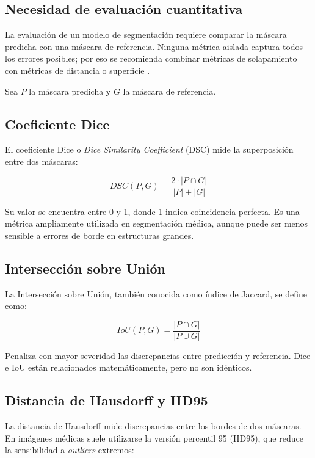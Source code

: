 \subsection{Necesidad de evaluación cuantitativa}

La evaluación de un modelo de segmentación requiere comparar la máscara predicha con una máscara de referencia. Ninguna métrica aislada captura todos los errores posibles; por eso se recomienda combinar métricas de solapamiento con métricas de distancia o superficie \parencite{taha_metrics_2015,maierhein_metrics_reloaded_2024}.

Sea $P$ la máscara predicha y $G$ la máscara de referencia.

\subsection{Coeficiente Dice}

El coeficiente Dice o \textit{Dice Similarity Coefficient} (DSC) mide la superposición entre dos máscaras:

\begin{equation}
DSC(P,G)=\frac{2\cdot |P \cap G|}{|P|+|G|}
\end{equation}

Su valor se encuentra entre 0 y 1, donde 1 indica coincidencia perfecta. Es una métrica ampliamente utilizada en segmentación médica, aunque puede ser menos sensible a errores de borde en estructuras grandes.

\subsection{Intersección sobre Unión}

La Intersección sobre Unión, también conocida como índice de Jaccard, se define como:

\begin{equation}
IoU(P,G)=\frac{|P \cap G|}{|P \cup G|}
\end{equation}

Penaliza con mayor severidad las discrepancias entre predicción y referencia. Dice e IoU están relacionados matemáticamente, pero no son idénticos.

\subsection{Distancia de Hausdorff y HD95}

La distancia de Hausdorff mide discrepancias entre los bordes de dos máscaras. En imágenes médicas suele utilizarse la versión percentil 95 (HD95), que reduce la sensibilidad a \textit{outliers} extremos:

